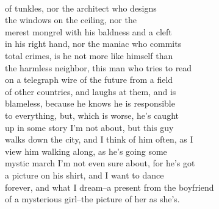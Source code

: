 \documentclass[smalldemyvopaper,11pt,twoside,onecolumn,openright,extrafontsizes]{memoir}
\begin{document}
\\of tunkles, nor the architect who designs
\\the windows on the ceiling, nor the
\\merest mongrel with his baldness and a cleft
\\in his right hand, nor the maniac who commits
\\total crimes, is he not more like himself than
\\the harmless neighbor, this man who tries to read
\\on a telegraph wire of the future from a field
\\of other countries, and laughs at them, and is
\\blameless, because he knows he is responsible
\\to everything, but, which is worse, he's caught
\\up in some story I'm not about, but this guy
\\walks down the city, and I think of him often, as I
\\view him walking along, as he's going some
\\mystic march I'm not even sure about, for he's got
\\a picture on his shirt, and I want to dance
\\forever, and what I dream--a present from the boyfriend
\\of a mysterious girl--the picture of her as she's.
\end{document}
